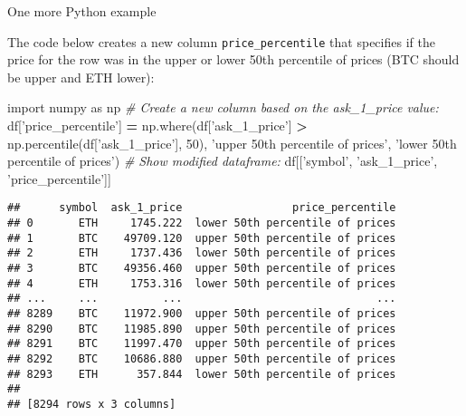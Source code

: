 \documentclass[
  ignorenonframetext,
]{beamer}
\newenvironment{Shaded}{\begin{snugshade}}{\end{snugshade}}
\newcommand{\CommentTok}[1]{\textcolor[rgb]{0.56,0.35,0.01}{\textit{#1}}}
\newcommand{\DecValTok}[1]{\textcolor[rgb]{0.00,0.00,0.81}{#1}}
\newcommand{\ImportTok}[1]{#1}
\newcommand{\NormalTok}[1]{#1}
\newcommand{\OperatorTok}[1]{\textcolor[rgb]{0.81,0.36,0.00}{\textbf{#1}}}
\newcommand{\StringTok}[1]{\textcolor[rgb]{0.31,0.60,0.02}{#1}}
\begin{document}
\begin{frame}[fragile]{One more Python example}
\protect\hypertarget{one-more-python-example}{}

The code below creates a new column \texttt{price\_percentile} that
specifies if the price for the row was in the upper or lower 50th
percentile of prices (BTC should be upper and ETH lower):

\begin{Shaded}
\begin{Highlighting}[]
\ImportTok{import}\NormalTok{ numpy }\ImportTok{as}\NormalTok{ np}
\CommentTok{# Create a new column based on the ask_1_price value:}
\NormalTok{df[}\StringTok{'price_percentile'}\NormalTok{] }\OperatorTok{=}\NormalTok{ np.where(df[}\StringTok{'ask_1_price'}\NormalTok{] }\OperatorTok{>} 
\NormalTok{                                  np.percentile(df[}\StringTok{'ask_1_price'}\NormalTok{], }\DecValTok{50}\NormalTok{),}
                            \StringTok{'upper 50th percentile of prices'}\NormalTok{, }
                            \StringTok{'lower 50th percentile of prices'}\NormalTok{)}
\CommentTok{# Show modified dataframe:}
\NormalTok{df[[}\StringTok{'symbol'}\NormalTok{, }\StringTok{'ask_1_price'}\NormalTok{, }\StringTok{'price_percentile'}\NormalTok{]]}
\end{Highlighting}
\end{Shaded}

\begin{verbatim}
##      symbol  ask_1_price                 price_percentile
## 0       ETH     1745.222  lower 50th percentile of prices
## 1       BTC    49709.120  upper 50th percentile of prices
## 2       ETH     1737.436  lower 50th percentile of prices
## 3       BTC    49356.460  upper 50th percentile of prices
## 4       ETH     1753.316  lower 50th percentile of prices
## ...     ...          ...                              ...
## 8289    BTC    11972.900  upper 50th percentile of prices
## 8290    BTC    11985.890  upper 50th percentile of prices
## 8291    BTC    11997.470  upper 50th percentile of prices
## 8292    BTC    10686.880  upper 50th percentile of prices
## 8293    ETH      357.844  lower 50th percentile of prices
## 
## [8294 rows x 3 columns]
\end{verbatim}

\end{frame}
\end{document}

